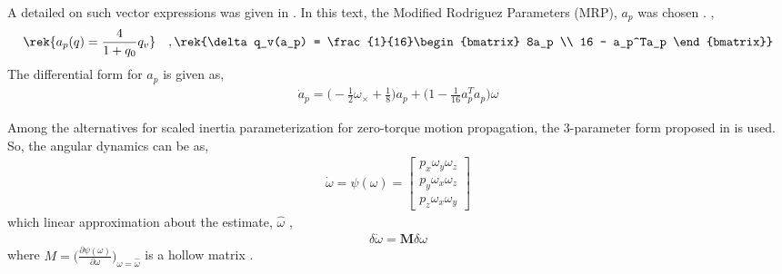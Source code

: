  A detailed  on such vector expressions was given in \cite{Markley}. In this text, the Modified Rodriguez Parameters (MRP), $a_p$ was chosen . ,
\begin{align}
\rek{a_p(q) = \frac{4}{1+q_0}q_v}\quad,
\rek{\delta q_v(a_p) = \frac{1}{16}\begin{bmatrix}
8a_p \\ 16 - a_p^Ta_p
\end{bmatrix}}
\end{align}
The differential form for $a_p$ is given as,
\begin{align} \label{eq_quat_kin}
\dot{a}_p = \Big(-\frac{1}{2}\omega_\times + \frac{1}{8}\Big)a_p + \Big(1 - \frac{1}{16}a_p^Ta_p\Big)\omega	 
\end{align}


Among the alternatives for scaled inertia parameterization for zero-torque motion propagation, \cite[\S 4.6]{TweddlePhD} the $3$-parameter form proposed in \cite{Aghili07} is used. So, the angular dynamics can be  as,
\begin{align} 
 \dot{\omega} = \psi(\omega) =  \begin{bmatrix}
 p_x \omega_y \omega_z \\
  p_y \omega_x \omega_z \\
   p_z \omega_x \omega_y  
 \end{bmatrix}
\end{align} 
which  linear approximation about the  estimate, $\hat{\omega}$ ,
\begin{align} \label{eq_lin_rot_dyn}
	\delta \dot{\omega} = \mathbf{M}\delta{\omega}
\end{align} where $M = \Big( \frac{\partial \psi(\omega)}{\partial \omega}\Big)_{\omega = \hat{\omega}}$ is a hollow matrix \cite{Aghili07}.

